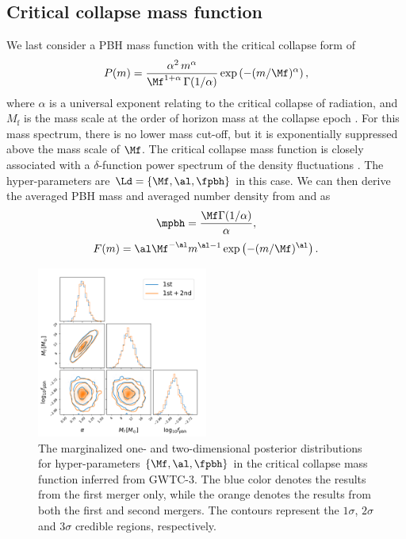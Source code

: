 \documentclass[twocolumn]{aastex631}
\def\({\left(}
\def\){\right)}
\def\e{\begin{equation}}
\def\q{\end{equation}}
\begin{document}
\subsection{Critical collapse mass function}
We last consider a PBH mass function with the critical collapse form \citep{Niemeyer:1997mt,Yokoyama:1998xd,Carr:2016hva,Gow:2020cou} of
\e
P(m)=\frac{\alpha^2\,  m^\alpha}{\Mf^{1+\alpha}\, \Gamma(1 / \alpha)} \exp \left(-(m/\Mf)^{\alpha}\right),
\q
where $\alpha$ is a universal exponent relating to the critical collapse of radiation, and $M_{\mathrm{f}}$ is the mass scale at the order of horizon mass at the collapse epoch \citep{Carr:2016hva}. 
For this mass spectrum, there is no lower mass cut-off, but it is exponentially suppressed above the mass scale of $\Mf$.
The critical collapse mass function is closely associated with a $\delta$-function power spectrum of the density fluctuations \citep{Niemeyer:1997mt,Yokoyama:1998xd,Carr:2016hva,Gow:2020cou}. 
The hyper-parameters are $\Ld = \{\Mf, \al, \fpbh\}$ in this case. 
We can then derive the averaged PBH mass and averaged number density from  and  as
\e
\mpbh = \frac{\Mf \Gamma(1 / \alpha)}{\alpha},
\q
\e 
F(m) = \al \Mf^{-\al} m^{\al -1} \exp\(-(m/\Mf)^{\al}\).
\q

\begin{figure}[tbp!]
	\centering
	\includegraphics[width=0.5\textwidth]{post-CC.pdf}
	\caption{\label{posterior-CC}The marginalized one- and two-dimensional posterior distributions for hyper-parameters $\{\Mf, \al, \fpbh\}$ in the critical collapse mass function inferred from GWTC-3. The blue color denotes the results from the first merger only, while the orange denotes the results from both the first and second mergers. The contours represent the $1\sigma$, $2\sigma$ and $3\sigma$ credible regions, respectively.}
\end{figure}
\end{document}
